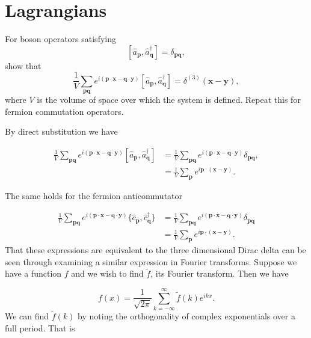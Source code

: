 \documentclass[../qft-for-the-gifted-amateur.tex]{subfiles}
\begin{document}
\section{Lagrangians}

\begin{questions}
	\printanswers
	
	\question For boson operators satisfying
	\[
	[{\hat{a}}_{\mathbf{p}},{\hat{a}}_{\mathbf{q}}^{\dagger}] = \delta_{\mathbf{p}\mathbf{q}},
	\]
	show that
	\[
	\frac{1}{V}\sum_{\mathbf{p}\mathbf{q}}e^{i(\mathbf{p} \cdot \mathbf{x} - \mathbf{q} \cdot \mathbf{y})}[{\hat{a}}_{\mathbf{p}},{\hat{a}}_{\mathbf{q}}^{\dagger}] = \delta^{(3)}(\mathbf{x} - \mathbf{y}),
	\]
	where $V$ is the volume of space over which the system is defined.
	Repeat this for fermion commutation operators.

	\begin{solution}
	By direct substitution we have

	\begin{align*}
		\frac{1}{V}\sum_{\mathbf{p}\mathbf{q}}e^{i(\mathbf{p} \cdot \mathbf{x} - \mathbf{q} \cdot \mathbf{y})}[{\hat{a}}_{\mathbf{p}},{\hat{a}}_{\mathbf{q}}^{\dagger}] &= \frac{1}{V}\sum_{\mathbf{p}\mathbf{q}}e^{i(\mathbf{p} \cdot \mathbf{x} - \mathbf{q} \cdot \mathbf{y})}\delta_{\mathbf{p}\mathbf{q}}, \\
		&= \frac{1}{V}\sum_{\mathbf{p}}e^{i\mathbf{p} \cdot (\mathbf{x} - \mathbf{y})}.
	\end{align*}

	The same holds for the fermion anticommutator

	\begin{align*}
		\frac{1}{V}\sum_{\mathbf{p}\mathbf{q}}e^{i(\mathbf{p} \cdot \mathbf{x} - \mathbf{q} \cdot \mathbf{y})}\{{\hat{c}}_{\mathbf{p}},{\hat{c}}_{\mathbf{q}}^{\dagger}\} &= \frac{1}{V}\sum_{\mathbf{p}\mathbf{q}}e^{i(\mathbf{p} \cdot \mathbf{x} - \mathbf{q} \cdot \mathbf{y})}\delta_{\mathbf{p}\mathbf{q}} \\
		&= \frac{1}{V}\sum_{\mathbf{p}}e^{i\mathbf{p} \cdot (\mathbf{x} - \mathbf{y})}.
	\end{align*}
	That these expressions are equivalent to the three dimensional Dirac
	delta can be seen through examining a similar expression in Fourier
	transforms. Suppose we have a function $f$ and we wish to find
	$\tilde{f}$, its Fourier transform. Then we have

	\[
	f(x) = \frac{1}{\sqrt{2\pi}}\sum_{k=-\infty}^{\infty}\tilde{f}(k)e^{ikx}.
	\]
	We can find $\tilde{f}(k)$ by noting the orthogonality of complex
	exponentials over a full period. That is


\end{solution}
\end{questions}
\end{document}
